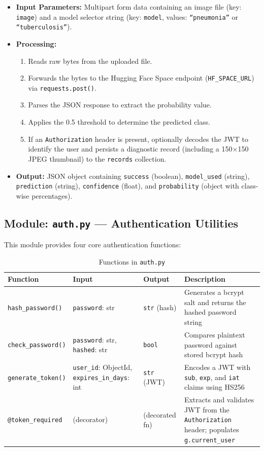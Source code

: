 \documentclass[12pt, a4paper, oneside]{report}
\begin{document}
\begin{itemize}
    \item \textbf{Input Parameters:} Multipart form data containing an image file (key: \texttt{image}) and a model selector string (key: \texttt{model}, values: \texttt{``pneumonia''} or \texttt{``tuberculosis''}).
    \item \textbf{Processing:}
    \begin{enumerate}
        \item Reads raw bytes from the uploaded file.
        \item Forwards the bytes to the Hugging Face Space endpoint (\texttt{HF\_SPACE\_URL}) via \texttt{requests.post()}.
        \item Parses the JSON response to extract the probability value.
        \item Applies the 0.5 threshold to determine the predicted class.
        \item If an \texttt{Authorization} header is present, optionally decodes the JWT to identify the user and persists a diagnostic record (including a 150$\times$150 JPEG thumbnail) to the \texttt{records} collection.
    \end{enumerate}
    \item \textbf{Output:} JSON object containing \texttt{success} (boolean), \texttt{model\_used} (string), \texttt{prediction} (string), \texttt{confidence} (float), and \texttt{probability} (object with class-wise percentages).
\end{itemize}

\subsection{Module: \texttt{auth.py} --- Authentication Utilities}
\label{subsec:auth_py}

This module provides four core authentication functions:

\begin{table}[H]
\centering
\caption{Functions in \texttt{auth.py}}
\label{tab:auth_functions}
\begin{tabularx}{\textwidth}{lp{3.5cm}p{3cm}X}
\toprule
\textbf{Function} & \textbf{Input} & \textbf{Output} & \textbf{Description} \\
\midrule
\texttt{hash\_password()} & \texttt{password}: str & \texttt{str} (hash) & Generates a bcrypt salt and returns the hashed password string \\
\texttt{check\_password()} & \texttt{password}: str, \texttt{hashed}: str & \texttt{bool} & Compares plaintext password against stored bcrypt hash \\
\texttt{generate\_token()} & \texttt{user\_id}: ObjectId, \texttt{expires\_in\_days}: int & \texttt{str} (JWT) & Encodes a JWT with \texttt{sub}, \texttt{exp}, and \texttt{iat} claims using HS256 \\
\texttt{@token\_required} & (decorator) & (decorated fn) & Extracts and validates JWT from the \texttt{Authorization} header; populates \texttt{g.current\_user} \\
\bottomrule
\end{tabularx}
\end{table}
\end{document}
